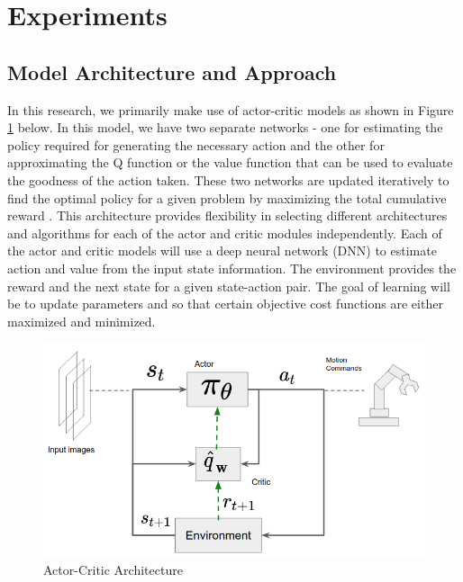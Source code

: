 \documentclass{article}
\begin{document}
\section{Experiments}
\subsection{Model Architecture and Approach}
In this research, we  primarily make use of actor-critic models as shown in Figure \ref{acfig} below. In this model, we have two separate networks - one for estimating the policy  required for generating the necessary action and the other for approximating the Q function or the value function  that can be used to evaluate the goodness of the action taken. These two networks are updated iteratively to find the optimal policy for a given problem by maximizing the total cumulative reward . This architecture provides flexibility in selecting different architectures and algorithms for each of the actor and critic modules independently. Each of the actor and critic models will use a deep neural network (DNN) to estimate action and value from the input state information. The environment provides the reward  and the next state  for a given state-action pair. The goal of learning will be to update parameters and so that certain objective cost functions are either maximized and minimized. 

\begin{figure}[H]
\centering
\includegraphics[scale=0.4]{actor-critic}
\caption{Actor-Critic Architecture}
\label{acfig}
\end{figure}
\end{document}
